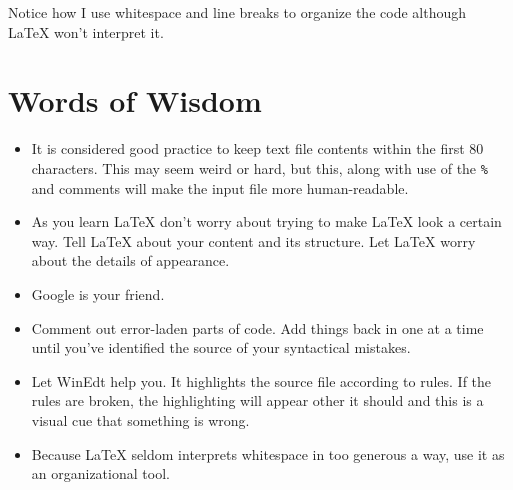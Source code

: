 \ovalbox{
    \begin{minipage}{\linewidth}
\begin{verbatim}
\[
\mathbf{1}_{\mathcal{X}}(x) = 
\begin{cases}
  1, & x \in \mathcal{X} \\
  0, & \textrm{otherwise}
\end{cases}.
\]
\end{verbatim}
    \end{minipage}
  } Notice how I use whitespace and line breaks to organize the code
  although \LaTeX{} won't interpret it.

\section{Words of Wisdom}

\begin{itemize}
\item It is considered good practice to keep text file contents within
  the first 80 characters. This may seem weird or hard, but this,
  along with use of the \texttt{\%} and comments will make the input
      file more human-readable.
    \item As you learn \LaTeX{} don't worry about trying to make
      \LaTeX{} look a certain way. Tell \LaTeX{} about your content
      and its structure. Let \LaTeX{} worry about the details of
      appearance.
    \item Google is your friend.

    \item Comment out error-laden parts of code. Add things back in
      one at a time until you've identified the source of your
      syntactical mistakes.

    \item Let WinEdt help you. It highlights the source file according
      to rules. If the rules are broken, the highlighting will appear
      other it should and this is a visual cue that something is
      wrong.

    \item Because \LaTeX{} seldom interprets whitespace in too
      generous a way, use it as an organizational tool.
\end{itemize}

% 



